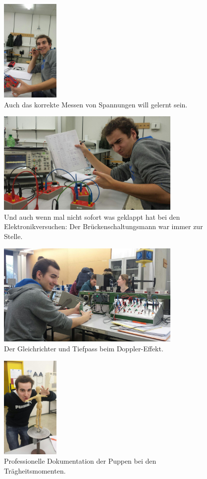 \begin{figure}
  \centering
  \includegraphics[height=5cm]{extra/photo_2016-07-05_00-44-22.jpg}
  \caption{Auch das korrekte Messen von Spannungen will gelernt sein.}
\end{figure}

\begin{figure}
  \centering
  \includegraphics[height=5cm]{extra/photo_2016-07-05_00-41-15.jpg}
  \caption{Und auch wenn mal nicht sofort was geklappt hat bei den Elektronikversuchen: Der Brückenschaltungsmann war immer zur Stelle.}
\end{figure}

\begin{figure}
  \centering
  \includegraphics[height=5cm]{extra/photo_2016-07-05_00-41-59.jpg}
  \caption{Der Gleichrichter und Tiefpass beim Doppler-Effekt.}
\end{figure}

\begin{figure}
  \centering
  \includegraphics[height=5cm]{extra/photo_2016-07-05_00-44-49.jpg}
  \caption{Professionelle Dokumentation der Puppen bei den Trägheitsmomenten.}
\end{figure}

